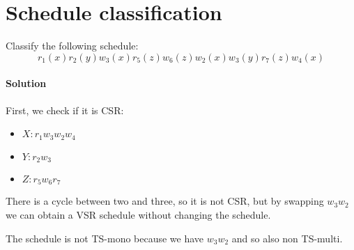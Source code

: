 \section{Schedule classification}

Classify the following schedule:
\[r_1(x) r_2(y) w_3(x) r_5(z) w_6(z) w_2(x) w_3(y) r_7(z) w_4(x)\] 

\paragraph*{Solution}
First, we check if it is CSR:
\begin{itemize}
    \item $X: r_1 w_3 w_2 w_4$
    \item $Y: r_2 w_3$
    \item $Z: r_5 w_6 r_7$
\end{itemize}
There is a cycle between two and three, so it is not CSR, but by swapping $w_3 w_2$ we can obtain a VSR schedule without changing the 
schedule. 

The schedule is not TS-mono because we have $w_3 w_2$ and so also non TS-multi. 